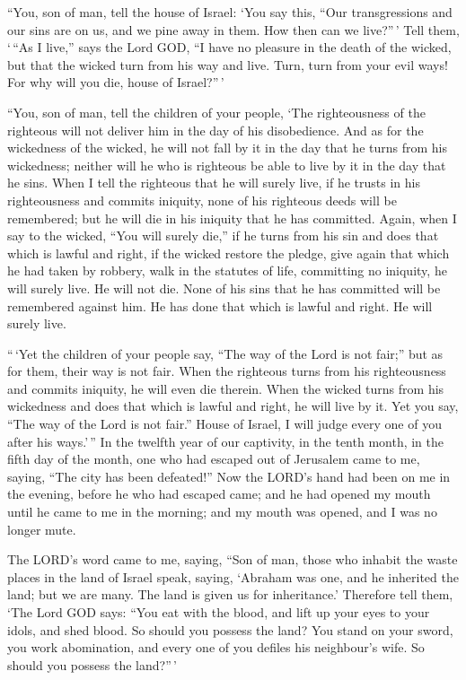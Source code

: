  ``You, son of man, tell the house of Israel: `You say
this, ``Our transgressions and our sins are on us, and we pine away in
them. How then can we live?''\,'  Tell them, `\,``As I
live,'' says the Lord GOD, ``I have no pleasure in the death of the
wicked, but that the wicked turn from his way and live. Turn, turn from
your evil ways! For why will you die, house of Israel?''\,'

 ``You, son of man, tell the children of your people, `The
righteousness of the righteous will not deliver him in the day of his
disobedience. And as for the wickedness of the wicked, he will not fall
by it in the day that he turns from his wickedness; neither will he who
is righteous be able to live by it in the day that he sins.
 When I tell the righteous that he will surely live, if he
trusts in his righteousness and commits iniquity, none of his righteous
deeds will be remembered; but he will die in his iniquity that he has
committed.  Again, when I say to the wicked, ``You will
surely die,'' if he turns from his sin and does that which is lawful and
right,  if the wicked restore the pledge, give again that
which he had taken by robbery, walk in the statutes of life, committing
no iniquity, he will surely live. He will not die.  None of
his sins that he has committed will be remembered against him. He has
done that which is lawful and right. He will surely live.

 ``\,`Yet the children of your people say, ``The way of the
Lord is not fair;'' but as for them, their way is not fair.
 When the righteous turns from his righteousness and
commits iniquity, he will even die therein.  When the
wicked turns from his wickedness and does that which is lawful and
right, he will live by it.  Yet you say, ``The way of the
Lord is not fair.'' House of Israel, I will judge every one of you after
his ways.'\,''  In the twelfth year of our captivity, in
the tenth month, in the fifth day of the month, one who had escaped out
of Jerusalem came to me, saying, ``The city has been defeated!''
 Now the LORD's hand had been on me in the evening, before
he who had escaped came; and he had opened my mouth until he came to me
in the morning; and my mouth was opened, and I was no longer mute.

 The LORD's word came to me, saying,  ``Son of
man, those who inhabit the waste places in the land of Israel speak,
saying, `Abraham was one, and he inherited the land; but we are many.
The land is given us for inheritance.'  Therefore tell
them, `The Lord GOD says: ``You eat with the blood, and lift up your
eyes to your idols, and shed blood. So should you possess the land?
 You stand on your sword, you work abomination, and every
one of you defiles his neighbour's wife. So should you possess the
land?''\,'

